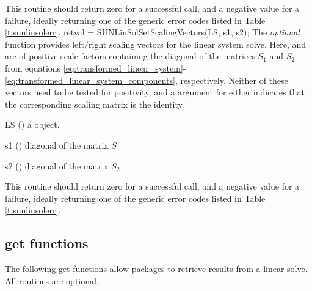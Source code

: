 {
  This routine should return zero for a successful call, and a
  negative value for a failure, ideally returning one of the generic
  error codes listed in Table \ref{t:sunlinsolerr}.
}
{}
{
  retval = SUNLinSolSetScalingVectors(LS, s1, s2);
}
{
  The \emph{optional} function 
  provides left/right scaling vectors for the linear system
  solve.  Here,  and  are {\nvector} of positive scale factors
  containing the diagonal of the matrices $S_1$ and $S_2$ from
  equations
  \eqref{eq:transformed_linear_system}-\eqref{eq:transformed_linear_system_components},
  respectively.
  Neither of these vectors need to be tested for positivity, and a 
  argument for either indicates that the corresponding scaling matrix
  is the identity.
}
{
  \begin{args}[LS]
  \item[LS] ()
    a {\sunlinsol} object.
  \item[s1] ()
    diagonal of the matrix $S_1$
  \item[s2] ()
    diagonal of the matrix $S_2$
  \end{args}
}
{
  This routine should return zero for a successful call, and a
  negative value for a failure, ideally returning one of the generic
  error codes listed in Table \ref{t:sunlinsolerr}.
}
{}


\subsection{ get functions}\label{ss:sunlinsol_GetFn}

The following get functions allow {\sundials} packages to retrieve
results from a linear solve.  All routines are optional.

